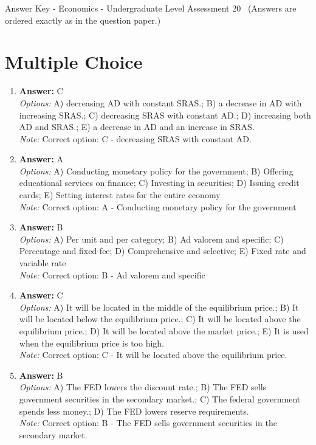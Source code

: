 \documentclass[12pt]{article}
\begin{document}
\begin{center}
Answer Key - Economics - Undergraduate Level Assessment 20 \
\small (Answers are ordered exactly as in the question paper.)
\end{center}

\section*{Multiple Choice}
\begin{enumerate}[label=\arabic*.]
\item \textbf{Answer:} C
\\ \textit{Options:} A) decreasing AD with constant SRAS.; B) a decrease in AD with increasing SRAS.; C) decreasing SRAS with constant AD.; D) increasing both AD and SRAS.; E) a decrease in AD and an increase in SRAS.
\\ \textit{Note:} Correct option: C - decreasing SRAS with constant AD.
\item \textbf{Answer:} A
\\ \textit{Options:} A) Conducting monetary policy for the government; B) Offering educational services on finance; C) Investing in securities; D) Issuing credit cards; E) Setting interest rates for the entire economy
\\ \textit{Note:} Correct option: A - Conducting monetary policy for the government
\item \textbf{Answer:} B
\\ \textit{Options:} A) Per unit and per category; B) Ad valorem and specific; C) Percentage and fixed fee; D) Comprehensive and selective; E) Fixed rate and variable rate
\\ \textit{Note:} Correct option: B - Ad valorem and specific
\item \textbf{Answer:} C
\\ \textit{Options:} A) It will be located in the middle of the equilibrium price.; B) It will be located below the equilibrium price.; C) It will be located above the equilibrium price.; D) It will be located above the market price.; E) It is used when the equilibrium price is too high.
\\ \textit{Note:} Correct option: C - It will be located above the equilibrium price.
\item \textbf{Answer:} B
\\ \textit{Options:} A) The FED lowers the discount rate.; B) The FED sells government securities in the secondary market.; C) The federal government spends less money.; D) The FED lowers reserve requirements.
\\ \textit{Note:} Correct option: B - The FED sells government securities in the secondary market.
\end{enumerate}
\end{document}
